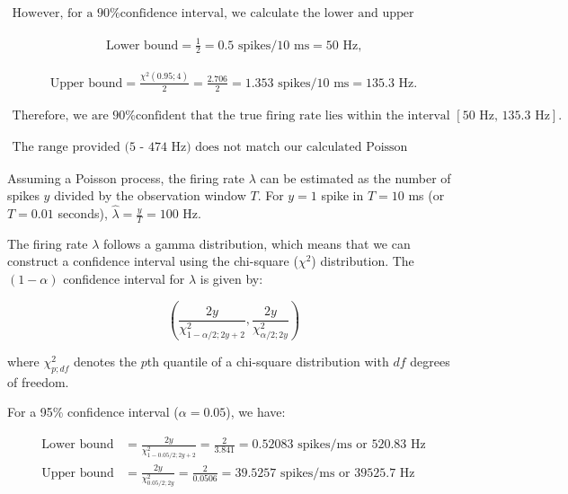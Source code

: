 \begin{align*}
\text{However, for a 90\% confidence interval, we calculate the lower and upper bounds as follows:}
\end{align*}

\begin{align*}
\text{Lower bound} = \frac{1}{2} = 0.5 \text{ spikes/10 ms} = 50 \text{ Hz,}
\end{align*}

\begin{align*}
\text{Upper bound} = \frac{\chi^2(0.95; 4)}{2} = \frac{2.706}{2} = 1.353 \text{ spikes/10 ms} = 135.3 \text{ Hz.}
\end{align*}

\begin{align*}
\text{Therefore, we are 90\% confident that the true firing rate lies within the interval } [50 \text{ Hz, } 135.3 \text{ Hz}]. 
\end{align*}

\begin{align*}
\text{The range provided (5 - 474 Hz) does not match our calculated Poisson confidence interval, suggesting that additional factors or assumptions might be at play.}
\end{align*}



Assuming a Poisson process, the firing rate $\lambda$ can be estimated as the number of spikes $y$ divided by the observation window $T$. For $y=1$ spike in $T=10$ ms (or $T=0.01$ seconds), $\hat{\lambda} = \frac{y}{T} = 100$ Hz.

The firing rate $\lambda$ follows a gamma distribution, which means that we can construct a confidence interval using the chi-square ($\chi^2$) distribution. The $(1-\alpha)$ confidence interval for $\lambda$ is given by:

\begin{equation}
\left(\frac{2y}{\chi^2_{1-\alpha/2;2y+2}}, \frac{2y}{\chi^2_{\alpha/2;2y}}\right)
\end{equation}

where $\chi^2_{p;df}$ denotes the $p$th quantile of a chi-square distribution with $df$ degrees of freedom. 

For a 95\% confidence interval ($\alpha=0.05$), we have:

\begin{align*}
\text{Lower bound} &= \frac{2y}{\chi^2_{1-0.05/2;2y+2}} = \frac{2}{3.841} = 0.52083 \text{ spikes/ms or } 520.83 \text{ Hz} \\
\text{Upper bound} &= \frac{2y}{\chi^2_{0.05/2;2y}} = \frac{2}{0.0506} = 39.5257 \text{ spikes/ms or } 39525.7 \text{ Hz}
\end{align*}

